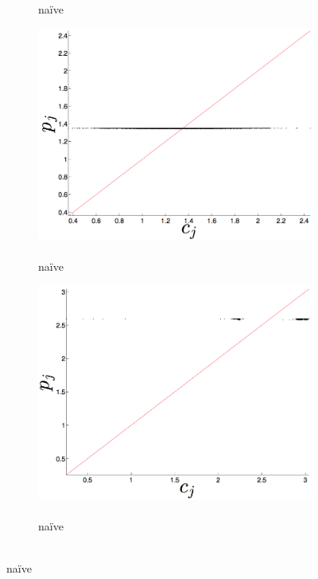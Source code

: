 \begin{figure}[htbp]
\begin{subfigure}{0.6\columnwidth}
    \caption{\col\\ na\"ive }
    \label{fig:gccMEAN}
  \end{subfigure}%
   \begin{subfigure}{0.6\columnwidth}
    \includegraphics[width=\columnwidth]{figs/gccMeanForecast.png}
    \caption{\gcc\\ na\"ive }
    \label{fig:gccMEAN}
  \end{subfigure}%
     \begin{subfigure}{0.6\columnwidth}
    \includegraphics[width=\columnwidth]{figs/svdfiveMeanForecast.png}
    \caption{\svdfive\\ na\"ive }
    \label{fig:gccMEAN}

\end{subfigure}
\end{figure}
